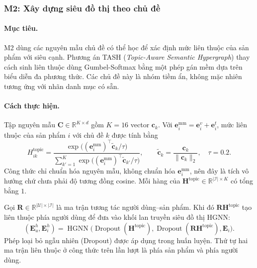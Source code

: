\subsubsection{M2: Xây dựng siêu đồ thị theo chủ đề}

\paragraph{Mục tiêu.}
M2 dùng các nguyên mẫu chủ đề có thể học để xác định mức liên thuộc của sản phẩm với siêu cạnh. Phương án TASH (\textit{Topic-Aware Semantic Hypergraph}) thay cách sinh liên thuộc dùng Gumbel-Softmax bằng một phép gán mềm dựa trên biểu diễn đa phương thức. Các chủ đề này là nhóm tiềm ẩn, không mặc nhiên tương ứng với nhãn danh mục có sẵn.

\paragraph{Cách thực hiện.}
Tập nguyên mẫu $\mathbf C\in\mathbb R^{K\times d}$ gồm $K=16$ vector $\mathbf c_k$. Với $\mathbf e_i^{\text{mm}}=\mathbf e_i^v+\mathbf e_i^t$, mức liên thuộc của sản phẩm $i$ với chủ đề $k$ được tính bằng
\begin{equation}
H_{ik}^{\text{topic}} =
\frac{\exp\bigl((\mathbf e_i^{\text{mm}})^\top\tilde{\mathbf c}_k/\tau\bigr)}
{\sum_{k'=1}^{K}\exp\bigl((\mathbf e_i^{\text{mm}})^\top\tilde{\mathbf c}_{k'}/\tau\bigr)},
\qquad \tilde{\mathbf c}_k=\frac{\mathbf c_k}{\|\mathbf c_k\|_2},\quad \tau=0.2.
\label{eq:tash_incidence}
\end{equation}
Công thức chỉ chuẩn hóa nguyên mẫu, không chuẩn hóa $\mathbf e_i^{\text{mm}}$, nên đây là tích vô hướng chứ chưa phải độ tương đồng cosine. Mỗi hàng của $\mathbf H^{\text{topic}}\in\mathbb R^{|\mathcal I|\times K}$ có tổng bằng $1$.

Gọi $\mathbf R\in\mathbb R^{|\mathcal U|\times|\mathcal I|}$ là ma trận tương tác người dùng--sản phẩm. Khi đó $\mathbf R\mathbf H^{\text{topic}}$ tạo liên thuộc phía người dùng để đưa vào khối lan truyền siêu đồ thị HGNN:
\begin{equation}
(\mathbf E_u^h,\mathbf E_i^h)=\operatorname{HGNN}\bigl(
\operatorname{Dropout}(\mathbf H^{\text{topic}}),
\operatorname{Dropout}(\mathbf R\mathbf H^{\text{topic}}),\mathbf E_i\bigr).
\label{eq:tash_propagation}
\end{equation}
Phép loại bỏ ngẫu nhiên (Dropout) được áp dụng trong huấn luyện. Thứ tự hai ma trận liên thuộc ở công thức trên lần lượt là phía sản phẩm và phía người dùng.

